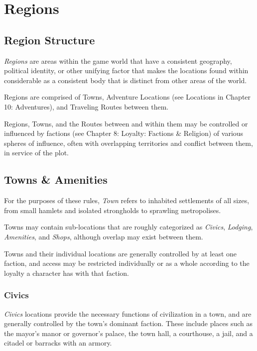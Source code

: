 
\chapter{Regions}

\section{Region Structure}
\textit{Regions} are areas within the game world that have a consistent geography,
political identity, or other unifying factor that makes the locations found within
considerable as a consistent body that is distinct from other areas of the world.

\vspace{0.4em}

Regions are comprised of Towns, Adventure Locations (see Locations in Chapter 10: Adventures), 
and Traveling Routes between them.

\vspace{0.4em}

Regions, Towns, and the Routes between and within them may be controlled or influenced by
factions (see Chapter 8: Loyalty: Factions \& Religion) of various spheres of influence, 
often with overlapping territories and conflict between them, in service of the plot.


\section{Towns \& Amenities}
For the purposes of these rules, \textit{Town} refers to inhabited settlements of all sizes, 
from small hamlets and isolated strongholds to sprawling metropolises.

\vspace{0.4em}

Towns may contain sub-locations that are roughly categorized as \textit{Civics}, 
\textit{Lodging}, \textit{Amenities}, and \textit{Shops}, although overlap may exist between them.

\vspace{0.4em}

Towns and their individual locations are generally controlled by at least one faction,
and access may be restricted individually or as a whole according to the loyalty a character has with that faction.


\subsection{Civics}
\textit{Civics} locations provide the necessary functions of civilization in a town, 
and are generally controlled by the town's dominant faction. 
These include places such as the mayor's manor or governor's palace, the town hall, a courthouse, a jail, 
and a citadel or barracks with an armory.

